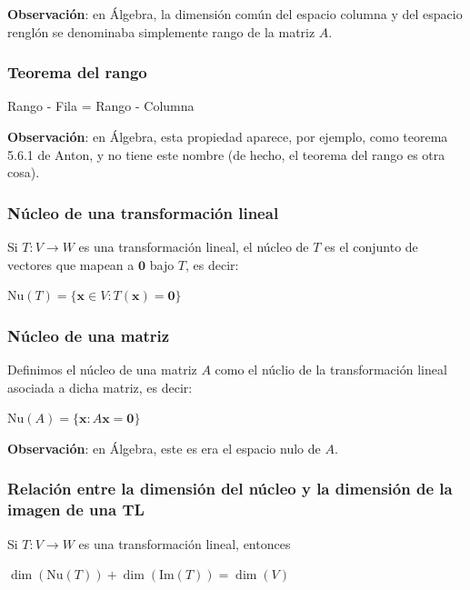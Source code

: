 \documentclass[10pt,a4paper]{article}
\begin{document}
\textbf{Observación}: en Álgebra, la dimensión común del espacio columna y del espacio renglón se denominaba simplemente rango de la matriz $A$.

\subsubsection*{Teorema del rango}

Rango - Fila = Rango - Columna

\textbf{Observación}: en Álgebra, esta propiedad aparece, por ejemplo, como teorema 5.6.1 de Anton, y no tiene este nombre (de hecho, el teorema del rango es otra cosa).

\subsubsection*{Núcleo de una transformación lineal}

Si $T:V \rightarrow W$ es una transformación lineal, el núcleo de $T$ es el conjunto de vectores que mapean a $\textbf{0}$ bajo $T$, es decir:

\begin{center}
$\text{Nu}(T) = \{\textbf{x} \in V : T(\textbf{x}) = \textbf{0}\}$
\end{center}

\subsubsection*{Núcleo de una matriz}

Definimos el núcleo de una matriz $A$ como el núclio de la transformación lineal asociada a dicha matriz, es decir:

\begin{center}
$\text{Nu}(A) = \{\textbf{x} : A\textbf{x} = \textbf{0}\}$
\end{center}

\textbf{Observación}: en Álgebra, este es era el espacio nulo de $A$.

\subsubsection*{Relación entre la dimensión del núcleo y la dimensión de la imagen de una TL}

Si $T:V \rightarrow W$ es una transformación lineal, entonces

\begin{center}
$\dim(\text{Nu}(T)) + \dim(\text{Im}(T)) = \dim(V)$
\end{center}
\end{document}
